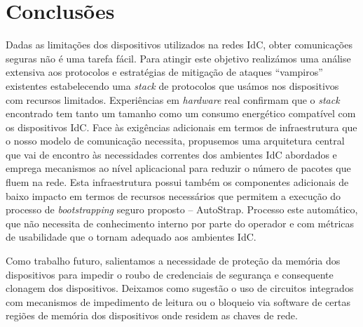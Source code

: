 \documentclass{llncs}
\begin{document}
\section{Conclusões}
\label{sec:conclusion}
Dadas as limitações dos dispositivos utilizados na redes \ac{IdC}, obter comunicações seguras não é uma tarefa fácil. Para atingir este objetivo realizámos uma análise extensiva aos protocolos e estratégias de mitigação de ataques ``vampiros'' existentes estabelecendo uma \textit{stack} de protocolos que usámos nos dispositivos com recursos limitados. Experiências em \textit{hardware} real confirmam que o \textit{stack} encontrado tem tanto um tamanho como um consumo energético compatível com os dispositivos \ac{IdC}.
Face às exigências adicionais em termos de infraestrutura que o nosso modelo de comunicação necessita, propusemos uma arquitetura central que vai de encontro às necessidades correntes dos ambientes \ac{IdC} abordados e emprega mecanismos ao nível aplicacional para reduzir o número de pacotes que fluem na rede. Esta infraestrutura possui também os componentes adicionais de baixo impacto em termos de recursos necessários que permitem a execução do processo de \textit{bootstrapping} seguro proposto -- AutoStrap. Processo este automático, que não necessita de conhecimento interno por parte do operador e com métricas de usabilidade que o tornam adequado aos ambientes \ac{IdC}.

Como trabalho futuro, salientamos a necessidade de proteção da memória dos dispositivos para impedir o roubo de credenciais de segurança e consequente clonagem dos dispositivos. Deixamos como sugestão o uso de circuitos integrados com mecanismos de impedimento de leitura ou o bloqueio via software de certas regiões de memória dos dispositivos onde residem as chaves de rede.
%



\end{document}

